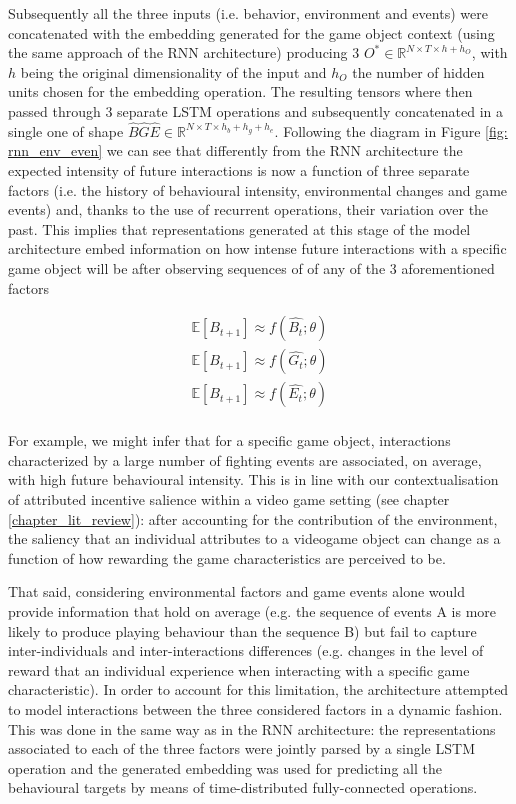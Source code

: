Subsequently all the three inputs (i.e. behavior, environment and events) were concatenated with the embedding generated for the game object context (using the same approach of the RNN architecture) producing 3 $O^*  \in \mathbb{R}^{N \times T \times h + h_O}$, with $h$ being the original dimensionality of the input and $h_O$ the number of hidden units chosen for the embedding operation. The resulting tensors where then passed through 3 separate LSTM operations and subsequently concatenated in a single one of shape $\widehat{B}\widehat{G}\widehat{E}  \in \mathbb{R}^{N \times T \times h_b + h_g + h_e}$. Following the diagram in Figure \ref{fig: rnn_env_even} we can see that differently from the RNN architecture the expected intensity of future interactions is now a function of three separate factors (i.e. the history of behavioural intensity, environmental changes and game events) and, thanks to the use of recurrent operations, their variation over the past. This implies that representations generated at this stage of the model architecture embed information on how intense future interactions with a specific game object will be after observing sequences of of any of the 3 aforementioned factors

\begin{gather}
\label{rnn_env_even_1_exp}
   \mathbb{E}[B_{t+1}] \approx  f(\widehat{B_t}; \theta) \\ \nonumber  
   \mathbb{E}[B_{t+1}] \approx  f(\widehat{G_t}; \theta) \\ \nonumber  
   \mathbb{E}[B_{t+1}] \approx  f(\widehat{E_t}; \theta) \\ \nonumber  
\end{gather}

For example, we might infer that for a specific game object, interactions characterized by a large number of fighting events are associated, on average, with high future behavioural intensity. This is in line with our contextualisation of attributed incentive salience within a video game setting (see chapter \ref{chapter_lit_review}): after accounting for the contribution of the environment, the saliency that an individual attributes to a videogame object can change as a function of how rewarding the game characteristics are perceived to be. 

That said, considering environmental factors and game events alone would provide information that hold on average (e.g. the sequence of events A is more likely to produce playing behaviour than the sequence B) but fail to capture inter-individuals and inter-interactions differences (e.g. changes in the level of reward that an individual experience when interacting with a specific game characteristic). In order to account for this limitation, the architecture attempted to model interactions between the three considered factors in a dynamic fashion. This was done in the same way as in the RNN architecture: the representations associated to each of the three factors were jointly parsed by a single LSTM operation and the generated embedding was used for predicting all the behavioural targets by means of time-distributed fully-connected operations. 

